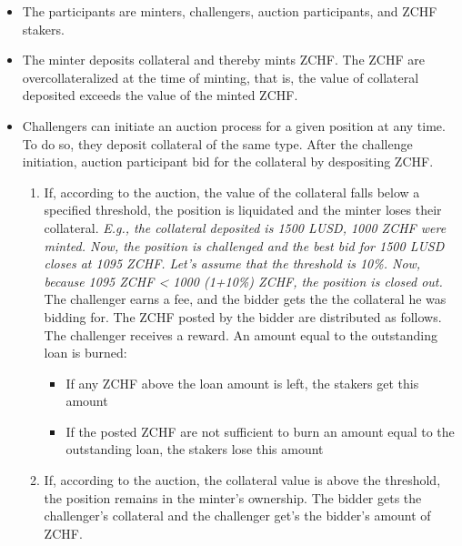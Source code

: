\documentclass[english,11pt]{article}
\begin{document}
\begin{itemize}
\item The participants are minters, challengers, auction participants, and ZCHF stakers.
\item The minter deposits collateral and thereby mints ZCHF. The ZCHF are overcollateralized at the time
of minting, that is, the value of collateral deposited exceeds the value of the minted ZCHF.
\item Challengers can initiate an auction process for a given position at any time.
To do so, they deposit collateral of the same type. 
After the challenge initiation, auction participant bid for the collateral by despositing
ZCHF.
\begin{enumerate}
\item If, according to the auction, the value of the collateral falls below a specified threshold, the position is liquidated
and the minter loses their collateral. \emph{E.g., the collateral deposited is 1500 LUSD, 1000 ZCHF were minted. Now, the position
is challenged and the best bid for 1500 LUSD closes at 1095 ZCHF. Let's assume that the threshold is 10\%. Now, because 
1095 ZCHF < 1000 (1+10\%) ZCHF, the position is closed out.}
The challenger earns a fee, and the bidder gets the the collateral he was bidding for.
The ZCHF posted by the bidder are distributed as follows. The challenger
receives a reward. An amount equal to the outstanding loan is burned:
\begin{itemize}
\item If any ZCHF above the loan amount is left, the stakers get this amount
\item If the posted ZCHF are not sufficient to burn an amount equal to the outstanding loan,
the stakers lose this amount
\end{itemize}
\item If, according to the auction, the collateral value is above the threshold, the position remains in the minter's ownership. The bidder gets the challenger's collateral and
the challenger get's the bidder's amount of ZCHF.
\end{enumerate}
\end{itemize}
\end{document}
